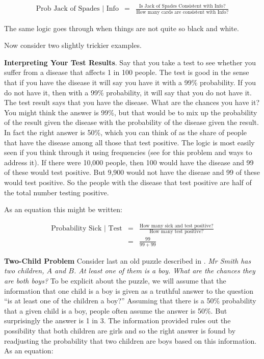 \documentclass[
  12pt,
]{book}
\begin{document}
\begin{eqnarray}
\text{Prob Jack of Spades | Info} &=& \frac{\text{Is Jack of Spades Consistent with Info?}}{\text{How many cards are consistent with Info?}}
 \end{eqnarray}

The same logic goes through when things are not quite so black and white.

Now consider two slightly trickier examples.

\textbf{Interpreting Your Test Results}. Say that you take a test to see whether you suffer from a disease that affects 1 in 100 people. The test is good in the sense that if you have the disease it will say you have it with a 99\% probability. If you do not have it, then with a 99\% probability, it will say that you do not have it. The test result says that you have the disease. What are the chances you have it? You might think the answer is 99\%, but that would be to mix up the probability of the result given the disease with the probability of the disease given the result. In fact the right answer is 50\%, which you can think of as the share of people that have the disease among all those that test positive. The logic is most easily seen if you think through it using frequencies (see \citet{hoffrage1998using} for this problem and ways to address it). If there were 10,000 people, then 100 would have the disease and 99 of these would test positive. But 9,900 would not have the disease and 99 of these would test positive. So the people with the disease that test positive are half of the total number testing positive.

As an equation this might be written:

\begin{eqnarray}
\text{Probability Sick | Test} &=& \frac{\text{How many sick and test positive?}}{\text{How many test positive?}}\\ 
&=& \frac{99}{99 + 99}
\end{eqnarray}

\textbf{Two-Child Problem} Consider last an old puzzle described in \citet{gardner1961second}. \emph{Mr Smith has two children, \(A\) and \(B\). At least one of them is a boy. What are the chances they are both boys?}
To be explicit about the puzzle, we will assume that the information that one child is a boy is given as a truthful answer to the question ``is at least one of the children a boy?'' Assuming that there is a 50\% probability that a given child is a boy, people often assume the answer is 50\%. But surprisingly the answer is 1 in 3. The information provided rules out the possibility that both children are girls and so the right answer is found by readjusting the probability that two children are boys based on this information. As an equation:
\end{document}
